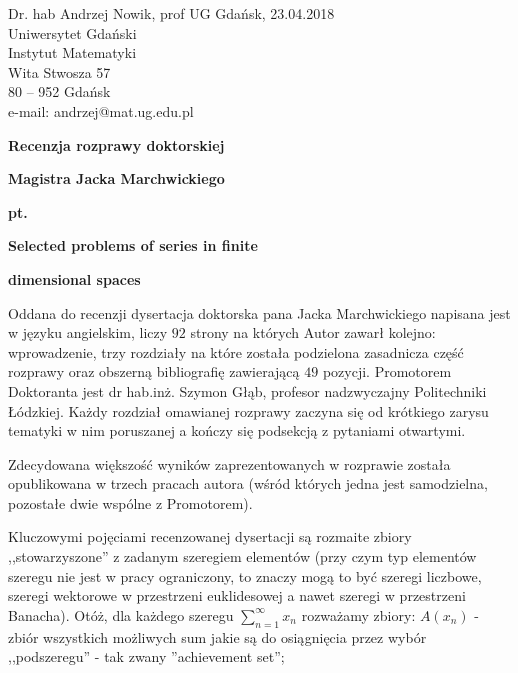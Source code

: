 \documentclass[12pt]{article}
\begin{document}

\begin{flushleft}
Dr. hab Andrzej Nowik, prof UG \hfill Gdańsk, 23.04.2018 \\
Uniwersytet Gdański \\
Instytut Matematyki \\
Wita Stwosza 57 \\
80 -- 952 Gdańsk \\
e-mail: andrzej@mat.ug.edu.pl\\
\end{flushleft}
\vspace{3mm}
\begin{center}{\bf \LARGE
Recenzja rozprawy doktorskiej }
\end{center}
\begin{center}
{\LARGE \bf
Magistra Jacka Marchwickiego
}
\end{center}
\begin{center}
\bf \Large pt.
\end{center}
\begin{center} \LARGE
\bf Selected problems of series in finite
\end{center}

\begin{center} \LARGE
\bf dimensional spaces
\end{center}


  Oddana do recenzji dysertacja doktorska pana Jacka Marchwickiego 
napisana jest w języku angielskim, liczy $92$
strony na których Autor zawarł kolejno: wprowadzenie, trzy
rozdzia\-ły na które została podzielona zasadnicza część rozprawy 
oraz obszerną biblio\-grafię zawie\-ra\-ją\-cą
$49$ pozycji. Promotorem Doktoranta jest dr hab.inż. Szymon Głąb,
profesor nadzwyczajny Politechniki Łódzkiej. Każdy rozdział omawianej rozprawy 
zaczyna się od krótkiego zarysu tematyki w nim poruszanej
a kończy się podsekcją z pytaniami otwartymi.

  Zdecydowana większość wyników zaprezentowanych w rozprawie
została opublikowana w trzech pracach autora (wśród których
jedna jest samodzielna, pozostałe dwie wspólne z Promotorem).

  Kluczowymi pojęciami recenzowanej dysertacji są
rozmaite zbiory ,,stowarzyszone'' z zadanym szeregiem
elementów (przy czym typ elementów szeregu nie jest w pracy ograniczony,
to znaczy mogą to być szeregi liczbowe, szeregi wektorowe w 
przestrzeni euklidesowej a nawet szeregi w przestrzeni Banacha).
  Otóż, dla każdego szeregu $\sum_{n=1}^\infty x_n$
rozważamy zbiory:
$A(x_n)$ - zbiór wszystkich możliwych sum jakie są
do osiągnięcia przez wybór ,,podszeregu'' - tak zwany
''achievement set'';
\end{document}
